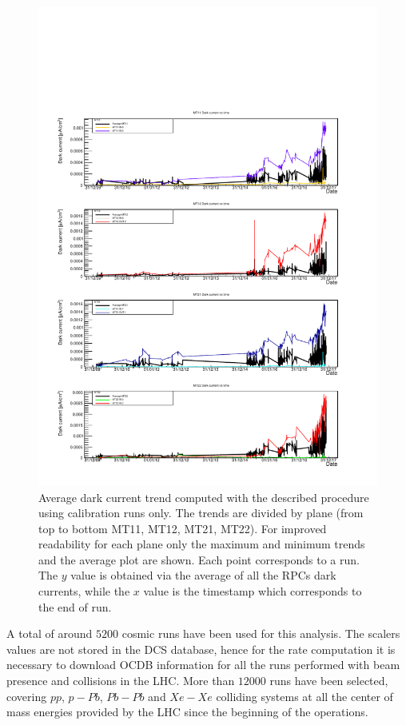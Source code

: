 \begin{figure}[!t]
\begin{center}
\includegraphics[width=0.95\linewidth]{Chapters/Performance/Figs/iDark_CALIB_minmax.pdf}
\caption{Average dark current trend computed with the described procedure using calibration runs only. The trends are divided by plane (from top to bottom MT11, MT12, MT21, MT22). For improved readability for each plane only the maximum and minimum trends and the average plot are shown. Each point corresponds to a run. The $y$ value is obtained via the average of all the RPCs dark currents, while the $x$ value is the timestamp which corresponds to the end of run.}
\label{fig:iDarkCALIB}
\end{center}
\end{figure}

A total of around $5200$ cosmic runs have been used for this analysis.
The scalers values are not stored in the DCS database, hence for the rate computation it is necessary to download OCDB information for all the runs performed with beam presence and collisions in the LHC.
More than $12000$ runs have been selected, covering $pp$, $p-Pb$, $Pb-Pb$ and $Xe-Xe$ colliding systems at all the center of mass energies provided by the LHC since the beginning of the operations.

